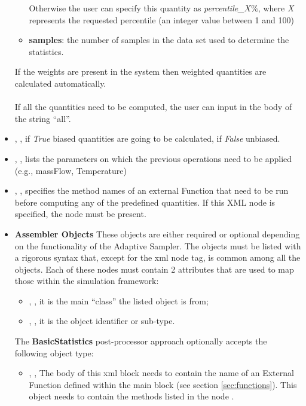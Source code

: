 \begin{itemize}
\begin{itemize}
                               Otherwise the user can specify this quantity as \textit{percentile\_$X\%$}, where \textit{X} represents the requested
                               percentile (an integer value between 1 and 100)
    \item \textbf{samples}: the number of samples in the data set used to determine the statistics.
  \end{itemize}
  \nb If the weights are present in the system then weighted quantities are calculated automatically.
  \\
  \\  If all the quantities need to be computed, the user can input in the body of
   the string ``all''.
  \item {}, , if \textit{True} biased
  quantities are going to be calculated, if \textit{False} unbiased.
  \item {}, ,
  lists the parameters on which the previous operations need to be applied
  (e.g., massFlow, Temperature)
  \item {}, , specifies the method names of an external Function that need to be run
  before computing any of the predefined quantities.
  If this XML node is specified, the  node must be present.
  \item \textbf{Assembler Objects} These objects are either required or optional
  depending on the functionality of the Adaptive Sampler.
  The objects must be listed with a rigorous syntax that, except for the xml
  node tag, is common among all the objects.
  Each of these nodes must contain 2 attributes that are used to map those
  within the simulation framework:
  \begin{itemize}
    \item {}, , it is the main
    ``class'' the listed object is from;
    \item {}, , it is the object
    identifier or sub-type.
  \end{itemize}
  The \textbf{BasicStatistics} post-processor approach optionally accepts the
  following object type:
  \begin{itemize}
    \item {}, , The body of
    this xml block needs to contain the name of an External Function defined
    within the  main block (see section \ref{sec:functions}).
    This object needs to contain the methods listed in the node
    .
  \end{itemize}
\end{itemize}
